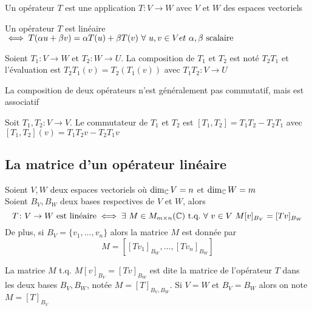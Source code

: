 \begin{definition}
    Un opérateur $T$ est une application $T\colon V \to W$ avec $V$ et $W$ des espaces vectoriels
\end{definition}
\begin{definition}
    Un opérateur $T$ est linéaire $\iff T(\alpha u + \beta v) = \alpha T(u) + \beta T(v) \ \forall \ u, v \in V et \ \alpha, \beta \text{ scalaire}$ 
\end{definition}
\begin{definition}
    Soient $T_1 \colon V \to W$ et $T_2 \colon W \to U$. La composition de $T_1$ et $T_2$ est noté
    $T_2 T_1$ et l'évaluation est $T_2 T_1 (v) = T_2(T_1(v))$ avec $T_1 T_2 \colon V \to U$
\end{definition}
\begin{remark}
    La composition de deux opérateurs n'est généralement pas commutatif, mais est associatif
\end{remark}
\begin{definition}
    Soit $T_1, T_2 \colon V \to V$. Le commutateur de $T_1$ et $T_2$ est 
    $[T_1, T_2] = T_1T_2 - T_2T_1$ avec $[T_1, T_2](v) = T_1T_2v - T_2T_1v$
\end{definition}

\subsection{La matrice d'un opérateur linéaire}
\begin{theorem}
    Soient $V, W$ deux espaces vectoriels où $\dim_{\mathbb{C}} V = n$ et $\dim_{\mathbb{C}} W = m$ \\
    Soient $B_V, B_W$ deux bases respectives de $V$ et $W$, alors 
    \[
    T\colon V \to W \ \text{est linéaire} \iff \exists \ M \in M_{m \times n}(\C) \ \text{t.q.} \ 
    \forall \ v \in V \ M[v]_{B_V} = [Tv]_{B_W}
    \]  
    De plus, si $B_V = \{v_1, \dots, v_n\}$ alors la matrice $M$ est donnée par 
    \[
    M = \left[ \left[ Tv_1 \right]_{B_W}, \dots, \left[ Tv_n \right]_{B_W} \right]
    \]
\end{theorem}
\begin{definition}
    La matrice $M$ t.q. $M[v]_{B_V} = [Tv]_{B_W}$ est dite la matrice de l'opérateur $T$
    dans les deux bases $B_V, B_W$, notée $M = [T]_{B_V, B_W}$. Si $V = W$ et $B_V = B_W$
    alors on note $M = [T]_{B_V}$
\end{definition}

